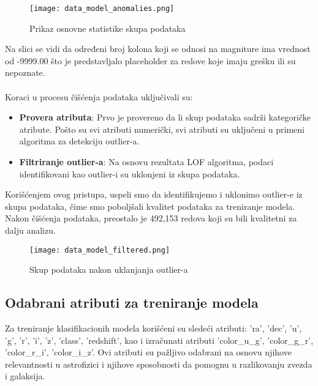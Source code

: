 \documentclass[a4paper,12pt]{article}
\begin{document}
\begin{figure}[h!]
\centering
\texttt{[image: data\_model\_anomalies.png]}
\caption{Prikaz osnovne statistike skupa podataka}
\label{fig:sql_query}
\end{figure}

Na slici se vidi da određeni broj kolona koji se odnosi na magniture ima vrednost od -9999.00 što je predstavljalo placeholder za redove koje imaju grešku ili su nepoznate.\\\\
Koraci u procesu čišćenja podataka uključivali su:
\begin{itemize}
    \item \textbf{Provera atributa}: Prvo je provereno da li skup podataka sadrži kategoričke atribute. Pošto su svi atributi numerički, svi atributi su uključeni u primeni algoritma za detekciju outlier-a.
    \item \textbf{Filtriranje outlier-a}: Na osnovu rezultata LOF algoritma, podaci identifikovani kao outlier-i su uklonjeni iz skupa podataka.
\end{itemize}
Korišćenjem ovog pristupa, uspeli smo da identifikujemo i uklonimo outlier-e iz skupa podataka, čime smo poboljšali kvalitet podataka za treniranje modela. Nakon čišćenja podataka, preostalo je 492,153 redova koji su bili kvalitetni za dalju analizu.

\begin{figure}[h!]
\centering
\texttt{[image: data\_model\_filtered.png]}
\caption{Skup podataka nakon uklanjanja outlier-a}
\label{fig:sql_query}
\end{figure}

\subsection{Odabrani atributi za treniranje modela}

Za treniranje klasifikacionih modela korišćeni su sledeći atributi: 'ra', 'dec', 'u', 'g', 'r', 'i', 'z', 'class', 'redshift', kao i izračunati atributi 'color\_u\_g', 'color\_g\_r', 'color\_r\_i', 'color\_i\_z'. Ovi atributi su pažljivo odabrani na osnovu njihove relevantnosti u astrofizici i njihove sposobnosti da pomognu u razlikovanju zvezda i galaksija.
\end{document}
